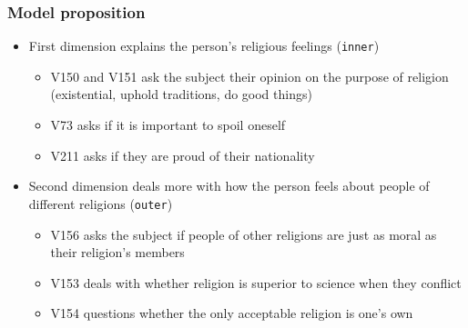 \documentclass{beamer}
\begin{document}

\begin{frame}
	\frametitle{Model proposition}
	\begin{itemize}
		\item First dimension explains the person's religious feelings (\texttt{inner}) 
		\begin{itemize}
			\item V150 and V151 ask the subject their opinion on the purpose of religion (existential, uphold traditions, do good things)
			\item V73 asks if it is important to spoil oneself
			\item V211 asks if they are proud of their nationality 
		\end{itemize}
		\item Second dimension deals more with how the person feels about people of different religions (\texttt{outer})
		\begin{itemize}
			\item V156 asks the subject if people of other religions are just as moral as their religion's members
			\item V153 deals with whether religion is superior to science when they conflict
			\item V154 questions whether the only acceptable religion is one's own
		\end{itemize}
	\end{itemize}
\end{frame}

\end{document}

